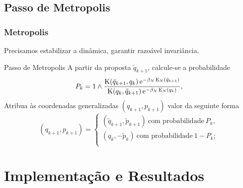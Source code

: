 \subsection{Passo de Metropolis}
\begin{frame}
	\frametitle{Metropolis}
	Precisamos estabilizar a dinâmica, garantir razoável invariância.
	
	\begin{block}{Passo de Metropolis}
		A partir da proposta $\tilde{q}_{k+1}$, calcule-se a probabilidade
		\[
			P_k = 1 \wedge \frac{\operatorname{K}(\tilde{q}_{k+1}, q_k) \operatorname{e}^{-\beta_N \operatorname{E}_N(\tilde{q}_{k+1})}}{\operatorname{K}(q_k, \tilde{q}_{k+1}) \operatorname{e}^{-\beta_N \operatorname{E}_N(q_{k})}},
		\]
		Atribua às coordenadas generalizadas $(q_{k+1}, p_{k+1})$ valor da seguinte forma
		\[
			(q_{k+1}, p_{k+1}) =
			\begin{cases}
				(\tilde{q}_{k+1}, \tilde{p}_{k+1}) \ \text{com probabilidade} \ P_k, \\
				(q_k, -\tilde{p}_{k}) \ \text{com probabilidade} \ 1-P_k; \\
			\end{cases}
		\]
	\end{block}

\end{frame}


\section{Implementação e Resultados}

